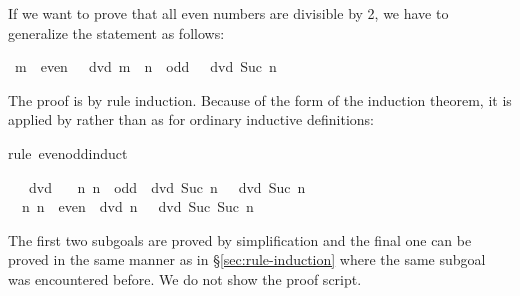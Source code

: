 \begin{isabellebody}
\begin{isamarkuptext}
If we want to prove that all even numbers are divisible by 2, we have to
generalize the statement as follows:%
\end{isamarkuptext}%
\ {\isachardoublequote}{\isacharparenleft}m\ {\isasymin}\ even\ {\isasymlongrightarrow}\ {}\ dvd\ m{\isacharparenright}\ {\isasymand}\ {\isacharparenleft}n\ {\isasymin}\ odd\ {\isasymlongrightarrow}\ {}\ dvd\ {\isacharparenleft}Suc\ n{\isacharparenright}{\isacharparenright}{\isachardoublequote}%
\begin{isamarkuptxt}%
\noindent
The proof is by rule induction. Because of the form of the induction theorem,
it is applied by  rather than  as for ordinary
inductive definitions:%
\end{isamarkuptxt}%
rule\ even{\isacharunderscore}odd{\isachardot}induct{\isacharparenright}%
\begin{isamarkuptxt}%
\begin{isabelle}%
\ {}{\isachardot}\ {}\ dvd\ {}\isanewline
\ {}{\isachardot}\ {\isasymAnd}n{\isachardot}\ {\isasymlbrakk}n\ {\isasymin}\ odd{\isacharsemicolon}\ {}\ dvd\ Suc\ n{\isasymrbrakk}\ {\isasymLongrightarrow}\ {}\ dvd\ Suc\ n\isanewline
\ {}{\isachardot}\ {\isasymAnd}n{\isachardot}\ {\isasymlbrakk}n\ {\isasymin}\ even{\isacharsemicolon}\ {}\ dvd\ n{\isasymrbrakk}\ {\isasymLongrightarrow}\ {}\ dvd\ Suc\ {\isacharparenleft}Suc\ n{\isacharparenright}%
\end{isabelle}
The first two subgoals are proved by simplification and the final one can be
proved in the same manner as in \S\ref{sec:rule-induction}
where the same subgoal was encountered before.
We do not show the proof script.%
\end{isamarkuptxt}%
\end{isabellebody}%
